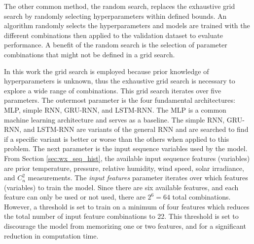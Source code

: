 The other common method, the random search, replaces the exhaustive grid search by randomly selecting hyperparameters within defined bounds. An algorithm randomly selects the hyperparameters and models are trained with the different combinations then applied to the validation dataset to evaluate performance. A benefit of the random search is the selection of parameter combinations that might not be defined in a grid search.

In this work the grid search is employed because prior knowledge of hyperparameters is unknown, thus the exhaustive grid search is necessary to explore a wide range of combinations. This grid search iterates over five parameters. The outermost parameter is the four fundamental architectures: \ac{MLP}, simple \ac{RNN}, \ac{GRU-RNN}, and \ac{LSTM-RNN}. The \ac{MLP} is a common machine learning architecture and serves as a baseline. The simple \ac{RNN}, \ac{GRU-RNN}, and \ac{LSTM-RNN} are variants of the general \ac{RNN} and are searched to find if a specific variant is better or worse than the others when applied to this problem. The next parameter is the input sequence variables used by the model. From Section \ref{sec:wx_seq_hist}, the available input sequence features (variables) are prior temperature, pressure, relative humidity, wind speed, solar irradiance, and $C_{n}^{2}$ measurements. The \textit{input features} parameter iterates over which features (variables) to train the model. Since there are six available features, and each feature can only be used or not used, there are $2^6 = 64$ total combinations. However, a threshold is set to train on a minimum of four features which reduces the total number of input feature combinations to 22. This threshold is set to discourage the model from memorizing one or two features, and for a significant reduction in computation time.

